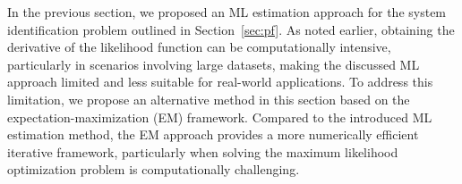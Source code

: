 In the previous section, we proposed an ML estimation approach for the system identification problem outlined in Section~\ref{sec:pf}. As noted earlier, obtaining the derivative of the likelihood function can be computationally intensive, particularly in scenarios involving large datasets, making the discussed ML approach limited and less suitable for real-world applications. To address this limitation, we propose an alternative method in this section based on the expectation-maximization (EM) framework. Compared to the introduced ML estimation method, the EM approach provides a more numerically efficient iterative framework, particularly when solving the maximum likelihood optimization problem is computationally challenging.
